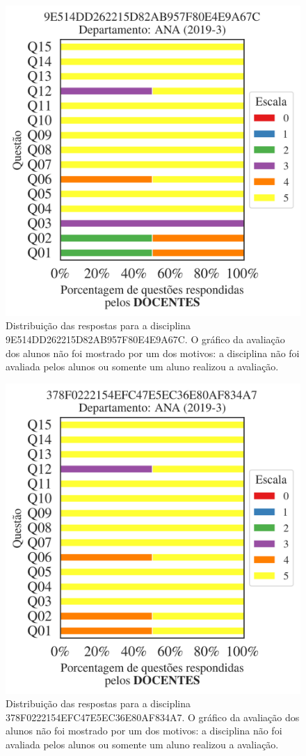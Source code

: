 \documentclass[a4paper,10pt]{article}
\begin{document}
\begin{figure}[h]
\centering
\includegraphics[width=0.485\linewidth]{analise_disciplina_departamento_ANA_9E514DD262215D82AB957F80E4E9A67C_docentes.png}
\caption{\label{fig:analise_geral_departamento}                Distribuição das respostas para a disciplina 9E514DD262215D82AB957F80E4E9A67C. O gráfico da avaliação dos alunos não foi mostrado  por um dos motivos:  a disciplina não foi avaliada pelos alunos ou somente um aluno realizou a avaliação. }
\end{figure}
\begin{figure}[h]
\centering
\includegraphics[width=0.485\linewidth]{analise_disciplina_departamento_ANA_378F0222154EFC47E5EC36E80AF834A7_docentes.png}
\caption{\label{fig:analise_geral_departamento}                Distribuição das respostas para a disciplina 378F0222154EFC47E5EC36E80AF834A7. O gráfico da avaliação dos alunos não foi mostrado  por um dos motivos:  a disciplina não foi avaliada pelos alunos ou somente um aluno realizou a avaliação. }
\end{figure}
\end{document}
